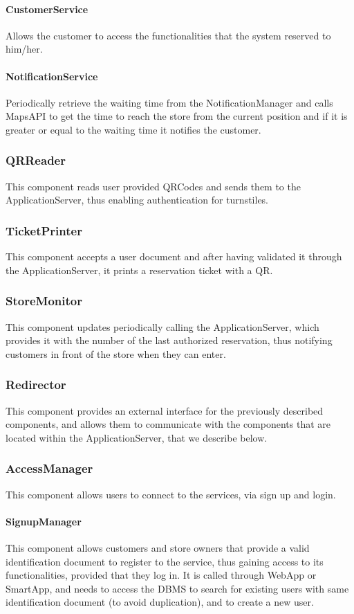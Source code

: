 \paragraph{CustomerService}Allows the customer to access the functionalities that the system reserved to him/her.
\paragraph{NotificationService}Periodically retrieve the waiting time from the NotificationManager and calls MapsAPI to get the time to reach the store from the current position and if it is greater or equal to the waiting time it notifies the customer.
\subsubsection{QRReader}
This component reads user provided QRCodes and sends them to the ApplicationServer, thus enabling authentication for turnstiles.
\subsubsection{TicketPrinter}
This component accepts a user document and after having validated it through the ApplicationServer, it prints a reservation ticket with a QR.
\subsubsection{StoreMonitor}
This component updates periodically calling the ApplicationServer, which provides it with the number of the last authorized reservation, thus notifying customers in front of the store when they can enter.
\subsubsection{Redirector}
This component provides an external interface for the previously described components, and allows them to communicate with the components that are located within the ApplicationServer, that we describe below.
\subsubsection{AccessManager}
This component allows users to connect to the services, via sign up and login.
\paragraph{SignupManager}
This component allows customers and store owners that provide a valid identification document to register to the service, thus gaining access to its functionalities, provided that they log in. It is called through WebApp or SmartApp, and needs to access the DBMS to search for existing users with same identification document (to avoid duplication), and to create a new user.
